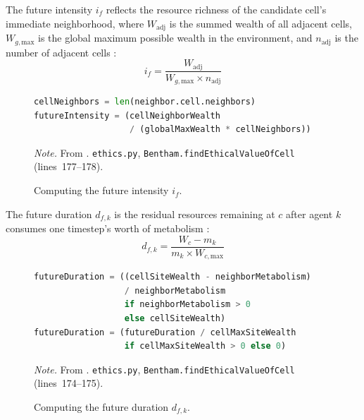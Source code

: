 \documentclass{icsthesis}
\begin{document}
\begin{mainmatter}
The future intensity $i_f$ reflects the resource richness of the candidate cell's immediate neighborhood, where $W_{\text{adj}}$ is the summed wealth of all adjacent cells, $W_{g,\mathrm{max}}$ is the global maximum possible wealth in the environment, and $n_{\text{adj}}$ is the number of adjacent cells \citep{KremerHerman2024}:
\begin{equation}
	i_f = \frac{W_{\text{adj}}}{W_{g,\mathrm{max}} \times n_{\text{adj}}}
\end{equation}
\begin{figure}[H]
\caption{Computing the future intensity \(i_f\).}
\begin{lstlisting}[language=Python, firstnumber=177]
cellNeighbors = len(neighbor.cell.neighbors)
futureIntensity = (cellNeighborWealth
                   / (globalMaxWealth * cellNeighbors))
\end{lstlisting}
{\footnotesize\noindent\textit{Note.} From \citet{KremerHerman2024}. \texttt{ethics.py}, \texttt{Bentham.findEthicalValueOfCell} (lines~177--178).}
\end{figure}

The future duration $d_{f,k}$ is the residual resources remaining at $c$ after agent $k$ consumes one timestep's worth of metabolism \citep{KremerHerman2024}:
\begin{equation}
	d_{f,k} = \frac{W_c - m_k}{m_k \times W_{c,\mathrm{max}}}
\end{equation}
\begin{figure}[H]
\caption{Computing the future duration \(d_{f,k}\).}
\begin{lstlisting}[language=Python, firstnumber=174]
futureDuration = ((cellSiteWealth - neighborMetabolism)
                  / neighborMetabolism
                  if neighborMetabolism > 0
                  else cellSiteWealth)
futureDuration = (futureDuration / cellMaxSiteWealth
                  if cellMaxSiteWealth > 0 else 0)
\end{lstlisting}
{\footnotesize\noindent\textit{Note.} From \citet{KremerHerman2024}. \texttt{ethics.py}, \texttt{Bentham.findEthicalValueOfCell} (lines~174--175).}
\end{figure}


\end{mainmatter}
\end{document}
